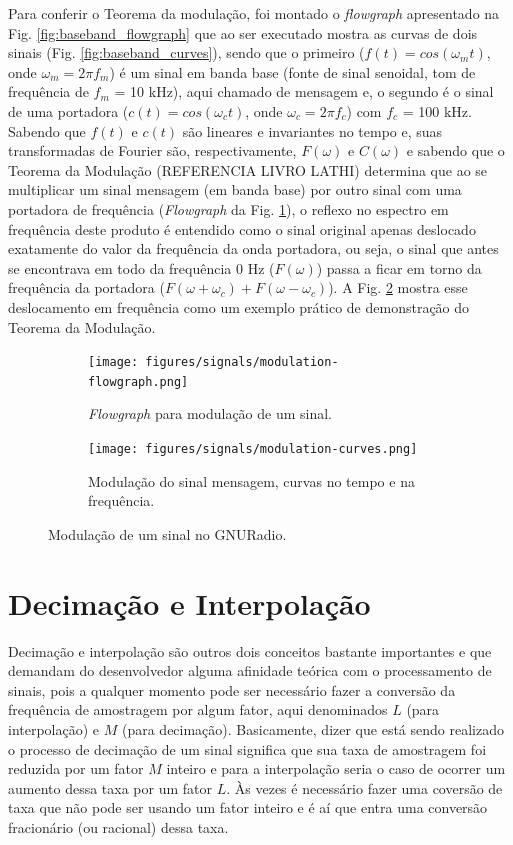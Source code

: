 \documentclass[
  12pt,				%
  openright,			%
  twoside,			%
  a4paper,			%
  english,			%
  french,				%
  spanish,			%
  brazil,				%
  ]{abntex2}
\begin{document}
Para conferir o Teorema da modulação, foi montado o \textit{flowgraph} apresentado na Fig. \ref{fig:baseband_flowgraph} que ao ser executado mostra as curvas de dois sinais (Fig. \ref{fig:baseband_curves}), sendo que o
primeiro ($f(t) = cos(\omega_mt)$, onde $\omega_m = 2 \pi f_m$) é um sinal em banda base (fonte de sinal senoidal, tom de frequência de $f_m$ = 10 kHz), aqui chamado de mensagem e, o segundo é
o sinal de uma portadora ($c(t) = cos(\omega_ct)$, onde $\omega_c = 2 \pi f_c$) com $f_c$ = 100 kHz. Sabendo que $f(t)$ e $c(t)$ são lineares e invariantes no tempo e, suas transformadas de Fourier
são, respectivamente, $F(\omega)$ e $C(\omega)$ e sabendo que o Teorema da Modulação (REFERENCIA LIVRO LATHI) determina que ao se multiplicar um sinal mensagem (em banda base) por outro sinal com uma portadora de frequência (\textit{Flowgraph} da
Fig. \ref{fig:modulation_flowgraph}), o reflexo no espectro em frequência deste produto é entendido como o sinal original apenas deslocado exatamente do valor da frequência da onda portadora, ou
seja, o sinal que antes se encontrava em todo da frequência 0 Hz ($F(\omega)$) passa a ficar em torno da frequência da portadora ($F(\omega + \omega_c) + F(\omega - \omega_c)$). A
Fig. \ref{fig:modulation_curves} mostra esse deslocamento em frequência como um exemplo prático de demonstração do Teorema da Modulação.

\begin{figure}[!htb]
  \centering
  \begin{subfigure}[b]{0.8\linewidth}
    \centering
    \caption{\textit{Flowgraph} para modulação de um sinal.}
    \texttt{[image: figures/signals/modulation-flowgraph.png]}
    \label{fig:modulation_flowgraph}
  \end{subfigure}

  \begin{subfigure}[b]{0.8\linewidth}
    \centering
    \caption{Modulação do sinal mensagem, curvas no tempo e na frequência.}
    \texttt{[image: figures/signals/modulation-curves.png]}
    \label{fig:modulation_curves}
  \end{subfigure}
  \caption{Modulação de um sinal no GNURadio.}
  \label{fig:modulation_signals}
\end{figure}

\newpage
\section*{Decimação e Interpolação}

Decimação e interpolação são outros dois conceitos bastante importantes e que demandam do desenvolvedor alguma afinidade teórica com o processamento de sinais, pois a qualquer momento pode ser
necessário fazer a conversão da frequência de amostragem por algum fator, aqui denominados $L$ (para interpolação) e $M$ (para decimação). Basicamente, dizer que está sendo realizado o processo
de decimação de um sinal significa que sua taxa de amostragem foi reduzida por um fator $M$ inteiro e para a interpolação seria o caso de ocorrer um aumento dessa taxa por um fator $L$.
Às vezes é necessário fazer uma coversão de taxa que não pode ser usando um fator inteiro e é aí que entra uma conversão fracionário (ou racional) dessa taxa.
\end{document}
